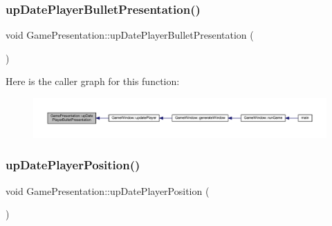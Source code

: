 \subsubsection{\texorpdfstring{up\+Date\+Player\+Bullet\+Presentation()}{upDatePlayerBulletPresentation()}}
{\footnotesize\ttfamily void Game\+Presentation\+::up\+Date\+Player\+Bullet\+Presentation (\begin{DoxyParamCaption}{ }\end{DoxyParamCaption})}

Here is the caller graph for this function\+:\nopagebreak
\begin{figure}[H]
\begin{center}
\leavevmode
\includegraphics[width=350pt]{class_game_presentation_af0a19d50c4099e7a19426cdffa5ebb82_icgraph}
\end{center}
\end{figure}
\mbox{\label{class_game_presentation_a08abc97c6f65eda4ac7c54d55a9054b4}} 
\subsubsection{\texorpdfstring{up\+Date\+Player\+Position()}{upDatePlayerPosition()}}
{\footnotesize\ttfamily void Game\+Presentation\+::up\+Date\+Player\+Position (\begin{DoxyParamCaption}{ }\end{DoxyParamCaption})}

